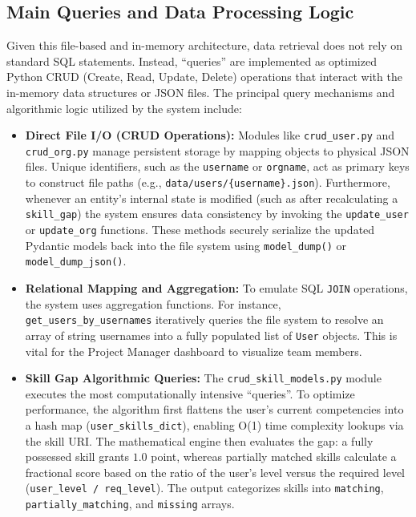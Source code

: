 \documentclass{article}
\begin{document}
\subsection{Main Queries and Data Processing Logic}
Given this file-based and in-memory architecture, data retrieval does not rely 
on standard SQL statements. 
Instead, ``queries'' are implemented as optimized Python CRUD (Create, Read, 
Update, Delete) operations that interact with the in-memory data structures or 
JSON files.
The principal query mechanisms and algorithmic logic utilized by the system include:

\begin{itemize}
    \item \textbf{Direct File I/O (CRUD Operations):} Modules like 
    \texttt{crud\_user.py} and \texttt{crud\_org.py} manage persistent 
    storage by mapping objects to physical JSON files. Unique identifiers, 
    such as the \texttt{username} or \texttt{orgname}, act as primary keys 
    to construct file paths (e.g., \texttt{data/users/\{username\}.json}).
    Furthermore, whenever an entity's internal state is modified (such as after 
    recalculating a \texttt{skill\_gap}) the system ensures data consistency by 
    invoking the \texttt{update\_user} or \texttt{update\_org} functions. 
    These methods securely serialize the updated Pydantic models back into the 
    file system using \texttt{model\_dump()} or \texttt{model\_dump\_json()}.
    
    \item \textbf{Relational Mapping and Aggregation:} To emulate SQL 
    \texttt{JOIN} operations, the system uses aggregation functions. 
    For instance, \texttt{get\_users\_by\_usernames} iteratively queries 
    the file system to resolve an array of string usernames into a fully 
    populated list of \texttt{User} objects. This is vital for the Project 
    Manager dashboard to visualize team members.
    
    \item \textbf{Skill Gap Algorithmic Queries:} The \texttt{crud\_skill\_models.py} 
    module executes the most computationally intensive ``queries''.  To optimize 
    performance, the algorithm first flattens the user's current competencies into 
    a hash map (\texttt{user\_skills\_dict}), enabling O(1) time complexity lookups 
    via the skill URI. The mathematical engine then evaluates the gap: a fully 
    possessed skill grants $1.0$ point, whereas partially matched skills calculate 
    a fractional score based on the ratio of the user's level versus the required 
    level (\texttt{user\_level / req\_level}). The output categorizes skills into 
    \texttt{matching}, \texttt{partially\_matching}, and \texttt{missing} arrays.
    

\end{itemize}
\end{document}
